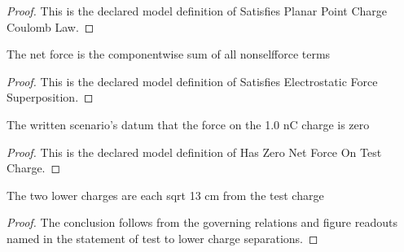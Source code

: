 \begin{proof}
  This is the declared model definition of Satisfies Planar Point Charge Coulomb Law.
\end{proof}
\begin{definition}
  \label{def:physics:phyx-mini-0899:phyxminiproblems-problemphyxmini0899-satisfieselectrostaticforcesuperposition}
  The net force is the componentwise sum of all nonselfforce terms
\end{definition}
\begin{proof}
  This is the declared model definition of Satisfies Electrostatic Force Superposition.
\end{proof}
\begin{definition}
  \label{def:physics:phyx-mini-0899:phyxminiproblems-problemphyxmini0899-haszeronetforceontestcharge}
  The written scenario's datum that the force on the 1.0 nC charge is zero
\end{definition}
\begin{proof}
  This is the declared model definition of Has Zero Net Force On Test Charge.
\end{proof}
\begin{lemma}
  \label{lem:physics:phyx-mini-0899:phyxminiproblems-problemphyxmini0899-test-to-lower-charge-separations}
  The two lower charges are each sqrt 13 cm from the test charge
\end{lemma}
\begin{proof}
  The conclusion follows from the governing relations and figure readouts named in the statement of test to lower charge separations.
\end{proof}
